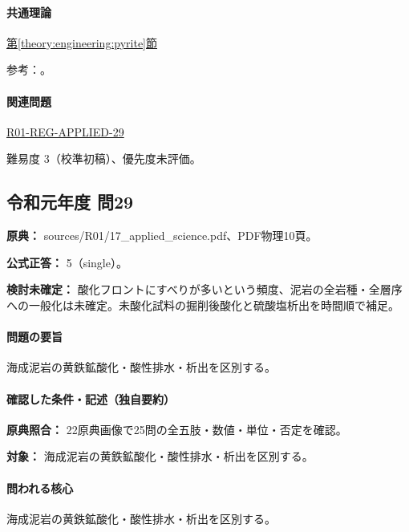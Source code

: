 \paragraph{共通理論} \hyperref[theory:engineering:pyrite]{第\ref*{theory:engineering:pyrite}節}

\par 参考：\cite{eng52_weathering,eng52_slip_weaklayer}。

\paragraph{関連問題} \hyperref[q:r01-reg-applied-29]{R01-REG-APPLIED-29}

\par 難易度 3（校準初稿）、優先度未評価。

\subsection{令和元年度 問29}
\label{q:r01-reg-applied-29}

\noindent\textbf{原典：} sources/R01/17\_applied\_science.pdf、PDF物理10頁。

\textbf{公式正答：} 5（single）。

\par\textbf{検討未確定：} 酸化フロントにすべりが多いという頻度、泥岩の全岩種・全層序への一般化は未確定。未酸化試料の掘削後酸化と硫酸塩析出を時間順で補足。

\paragraph{問題の要旨} 海成泥岩の黄鉄鉱酸化・酸性排水・析出を区別する。

\paragraph{確認した条件・記述（独自要約）}\mbox{}\par

\noindent\textbf{原典照合：} 22原典画像で25問の全五肢・数値・単位・否定を確認。\par

\noindent\textbf{対象：} 海成泥岩の黄鉄鉱酸化・酸性排水・析出を区別する。\par

\paragraph{問われる核心} 海成泥岩の黄鉄鉱酸化・酸性排水・析出を区別する。

